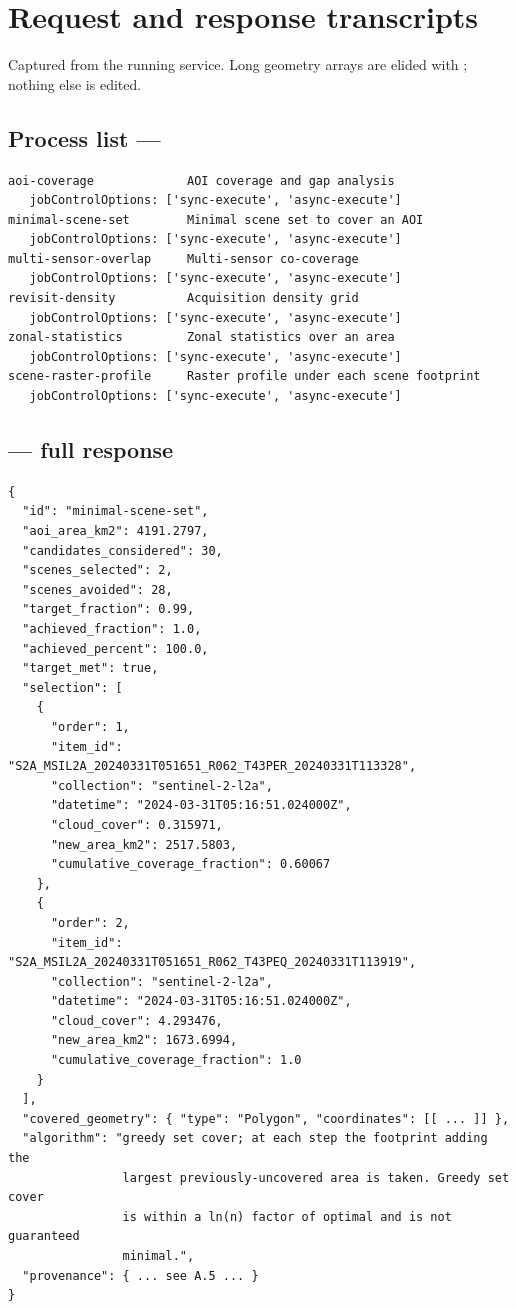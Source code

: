 \section{Request and response transcripts}
\label{app:transcripts}

Captured from the running service. Long geometry arrays are elided with
; nothing else is edited.

\subsection{Process list --- }

\begin{lstlisting}
aoi-coverage             AOI coverage and gap analysis
   jobControlOptions: ['sync-execute', 'async-execute']
minimal-scene-set        Minimal scene set to cover an AOI
   jobControlOptions: ['sync-execute', 'async-execute']
multi-sensor-overlap     Multi-sensor co-coverage
   jobControlOptions: ['sync-execute', 'async-execute']
revisit-density          Acquisition density grid
   jobControlOptions: ['sync-execute', 'async-execute']
zonal-statistics         Zonal statistics over an area
   jobControlOptions: ['sync-execute', 'async-execute']
scene-raster-profile     Raster profile under each scene footprint
   jobControlOptions: ['sync-execute', 'async-execute']
\end{lstlisting}

\subsection{ --- full response}

\begin{lstlisting}[style=json]
{
  "id": "minimal-scene-set",
  "aoi_area_km2": 4191.2797,
  "candidates_considered": 30,
  "scenes_selected": 2,
  "scenes_avoided": 28,
  "target_fraction": 0.99,
  "achieved_fraction": 1.0,
  "achieved_percent": 100.0,
  "target_met": true,
  "selection": [
    {
      "order": 1,
      "item_id": "S2A_MSIL2A_20240331T051651_R062_T43PER_20240331T113328",
      "collection": "sentinel-2-l2a",
      "datetime": "2024-03-31T05:16:51.024000Z",
      "cloud_cover": 0.315971,
      "new_area_km2": 2517.5803,
      "cumulative_coverage_fraction": 0.60067
    },
    {
      "order": 2,
      "item_id": "S2A_MSIL2A_20240331T051651_R062_T43PEQ_20240331T113919",
      "collection": "sentinel-2-l2a",
      "datetime": "2024-03-31T05:16:51.024000Z",
      "cloud_cover": 4.293476,
      "new_area_km2": 1673.6994,
      "cumulative_coverage_fraction": 1.0
    }
  ],
  "covered_geometry": { "type": "Polygon", "coordinates": [[ ... ]] },
  "algorithm": "greedy set cover; at each step the footprint adding the
                largest previously-uncovered area is taken. Greedy set cover
                is within a ln(n) factor of optimal and is not guaranteed
                minimal.",
  "provenance": { ... see A.5 ... }
}
\end{lstlisting}

